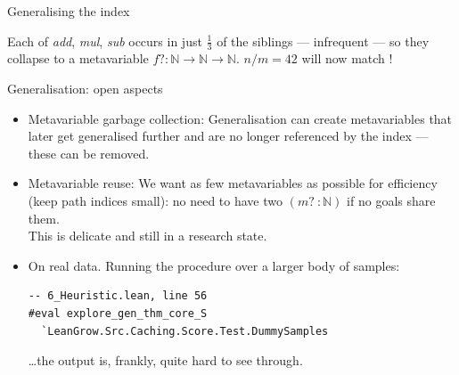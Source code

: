 \documentclass[aspectratio=169]{beamer}
\begin{document}
\begin{frame}{Generalising the index}
  \begin{center}
  \end{center}
  Each of \textit{add}, \textit{mul}, \textit{sub} occurs in just
  $\tfrac{1}{3}$ of the siblings --- \alert{infrequent} --- so they collapse to a
  metavariable $f? : \mathbb{N}\to\mathbb{N}\to\mathbb{N}$. $n/m=42$ will now match !
\end{frame}

\begin{frame}[fragile]{Generalisation: open aspects}
  \begin{itemize}
    \item \alert{Metavariable garbage collection}: Generalisation can create
          metavariables that later get generalised further and are no longer
          referenced by the index --- these can be removed.
    \item \alert{Metavariable reuse}: We want as few metavariables as possible for efficiency (keep path indices small): no need to have two $(m? \ :  \mathbb{N})$ if no goals share them.
          \\This is delicate and \alert{still in a research state}.
    \item \alert{On real data.} Running the procedure over a larger body of
          samples:
\begin{lstlisting}[basicstyle=\ttfamily\footnotesize]
-- 6_Heuristic.lean, line 56
#eval explore_gen_thm_core_S
  `LeanGrow.Src.Caching.Score.Test.DummySamples
\end{lstlisting}
          \ldots the output is, frankly, \alert{quite hard to see through}.
  \end{itemize}
\end{frame}
\end{document}
